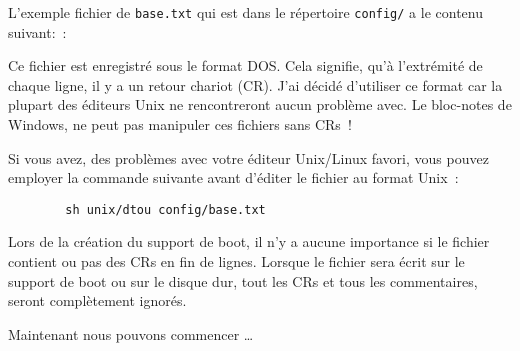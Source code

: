 

L'exemple fichier de \verb+base.txt+ qui est dans le répertoire \verb+config/+ a
le contenu suivant:~:

\begin{example}
\end{example}

\medskip

Ce fichier est enregistré sous le format DOS. Cela signifie, qu'à l'extrémité
de chaque ligne, il y a un retour chariot (CR). J'ai décidé d'utiliser ce format
car la plupart des éditeurs Unix ne rencontreront aucun problème avec. Le
bloc-notes de Windows, ne peut pas manipuler ces fichiers sans CRs~!

Si vous avez, des problèmes avec votre éditeur Unix/Linux favori, vous pouvez
employer la commande suivante avant d'éditer le fichier au format Unix~:

\begin{example}
\begin{verbatim}
        sh unix/dtou config/base.txt
\end{verbatim}
\end{example}

Lors de la création du support de boot, il n'y a aucune importance si le fichier
contient ou pas des CRs en fin de lignes. Lorsque le fichier sera écrit sur le
support de boot ou sur le disque dur, tout les CRs et tous les commentaires,
seront complètement ignorés.

Maintenant nous pouvons commencer \ldots